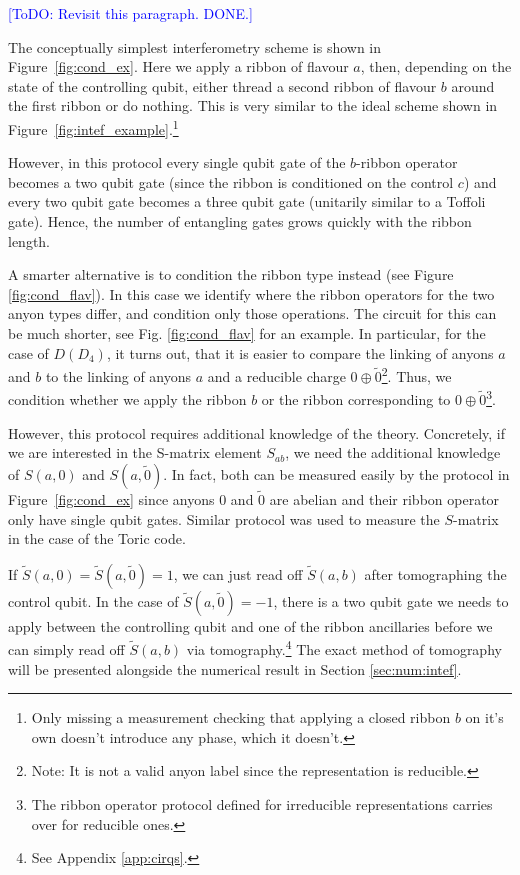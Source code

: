 \documentclass[two column]{article}
\newcommand{\jovan}[1]{\textcolor{blue}{[#1]}}
\begin{document}
\jovan{ToDO: Revisit this paragraph. DONE.}

The conceptually simplest interferometry scheme is shown in Figure~\ref{fig:cond_ex}. Here we apply a ribbon of flavour $a$, then, depending on the state of the controlling qubit, either thread a second ribbon of flavour $b$ around the first ribbon or do nothing. This is very similar to the ideal scheme shown in Figure~\ref{fig:intef_example}.\footnote{Only missing a measurement checking that applying a closed ribbon $b$ on it's own doesn't introduce any phase, which it doesn't.}

However, in this protocol every single qubit gate of the $b$-ribbon operator becomes a two qubit gate (since the ribbon is conditioned on the control $c$) and every two qubit gate becomes a three qubit gate (unitarily similar to a Toffoli gate). Hence, the number of entangling gates grows quickly with the ribbon length.

A smarter alternative is to condition the ribbon type instead (see Figure \ref{fig:cond_flav}). In this case we identify where the ribbon operators for the two anyon types differ, and condition only those operations. The circuit for this can be much shorter, see Fig. \ref{fig:cond_flav} for an example. In particular, for the case of $D(D_4)$, it turns out, that it is easier to compare the linking of anyons $a$ and $b$ to the linking of anyons $a$ and a reducible charge $0 \oplus \tilde 0$\footnote{Note: It is not a valid anyon label since the representation is reducible.}. Thus, we condition whether we apply the ribbon $b$ or the ribbon corresponding to $0 \oplus \tilde 0$\footnote{The ribbon operator protocol defined for irreducible representations carries over for reducible ones.}. 

However, this protocol requires additional knowledge of the theory. Concretely, if we are interested in the S-matrix element $S_{ab}$, we need the additional knowledge of  $S(a, 0)$ and $S(a, \tilde{0})$.
In fact, both can be measured easily by the protocol in Figure~\ref{fig:cond_ex} since anyons $0$ and $\tilde{0}$ are abelian and their ribbon operator only have single qubit gates. Similar protocol was used to measure the $S$-matrix in the case of the Toric code\cite{}.

If $\tilde S(a, 0) = \tilde S(a, \tilde{0}) = 1$, we can just read off $\tilde S(a,b)$ after tomographing the control qubit.
In the case of $\tilde S(a, \tilde{0}) = -1$, there is a two qubit gate we needs to apply between the controlling qubit and one of the ribbon ancillaries before we can simply read off $\tilde S(a,b)$ via tomography.\footnote{See Appendix \ref{app:cirqs}.}
The exact method of tomography will be presented alongside the numerical result in Section \ref{sec:num:intef}. 
\end{document}
